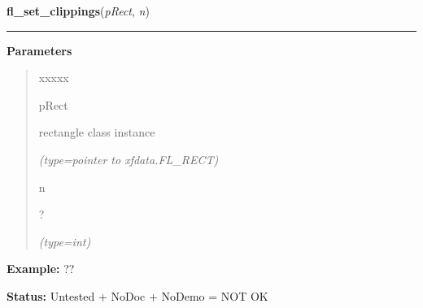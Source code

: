     \label{xformslib:flxbasic:fl_set_clippings}

    \vspace{0.5ex}

\hspace{.8\funcindent}\begin{boxedminipage}{\funcwidth}

    \raggedright \textbf{fl\_set\_clippings}(\textit{pRect}, \textit{n})

    \vspace{-1.5ex}

    \rule{\textwidth}{0.5\fboxrule}
\setlength{\parskip}{2ex}
\setlength{\parskip}{1ex}
      \textbf{Parameters}
      \vspace{-1ex}

      \begin{quote}
        \begin{Ventry}{xxxxx}

          \item[pRect]

          rectangle class instance

            {\it (type=pointer to xfdata.FL\_RECT)}

          \item[n]

          ?

            {\it (type=int)}

        \end{Ventry}

      \end{quote}

\textbf{Example:} ??



\textbf{Status:} Untested + NoDoc + NoDemo = NOT OK



    \end{boxedminipage}

    \label{xformslib:flxbasic:fl_unset_clipping}

    \vspace{0.5ex}

